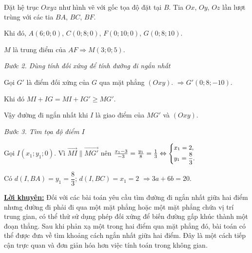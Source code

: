 \documentclass[12pt,a4paper,oneside]{book}
\theoremstyle{theorem}
\theoremstyle{definition}
\begin{document}
        Đặt hệ trục $Oxyz$ như hình vẽ với gốc tọa độ đặt tại $B$.
        Tia $Ox$, $Oy$, $Oz$ lần lượt trùng với các tia $BA$, $BC$, $BF$.
        
        Khi đó, $A(6;0;0)$, $C(0;8;0)$, $F(0;10;0)$, $G(0;8;10)$.
        
        $M$ là trung điểm của $AF\Rightarrow M(3;0;5)$.
        
       \noindent \textit{Bước 2. Dùng tính đối xứng để tính đường đi ngắn nhất}
        
        Gọi $G'$ là điểm đối xứng của $G$ qua mặt phẳng $(Oxy)$.
        $\Rightarrow G'(0;8;-10)$.
        
        Khi đó $MI+IG=MI+IG'\ge MG'$.
        
        Vậy đường đi ngắn nhất khi $I$ là giao điểm của $MG'$ và $(Oxy)$.
        
       \noindent \textit{Bước 3. Tìm tọa độ điểm $I$}
        
        Gọi $I(x_1;y_1;0)$. Vì $\overrightarrow{MI}\parallel\overrightarrow{MG'}$ nên
        $\frac{x_1-3}{-3}=\frac{y_1}{8}=\frac{1}{3}
        \Leftrightarrow
        \small \begin{cases}
        x_1=2,\\
        y_1=\dfrac{8}{3}.
        \end{cases}$
        
        Có $d(I,BA)=y_1=\dfrac{8}{3}$; $d(I,BC)=x_1=2$
        $\Rightarrow 3a+6b=20$.

        \noindent \underline{\textbf{Lời khuyên:}}
    Đối với các bài toán yêu cầu tìm đường đi ngắn nhất giữa hai điểm nhưng đường đi phải đi qua một mặt phẳng hoặc một mặt phẳng chứa vị trí trung gian, có thể thử sử dụng phép đối xứng để biến đường gấp khúc thành một đoạn thẳng. Sau khi phản xạ một trong hai điểm qua mặt phẳng đó, bài toán có thể được đưa về tìm khoảng cách ngắn nhất giữa hai điểm. Đây là một cách tiếp cận trực quan và đơn giản hóa hơn việc tính toán trong không gian.
    
\end{document}
